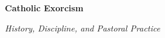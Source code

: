 \begin{titlepage}
\thispagestyle{empty}
\centering
\vspace*{0.045\textheight}
{\Huge\bfseries Catholic Exorcism\par}
\vspace{0.5em}
{\Large\itshape History, Discipline, and Pastoral Practice\par}
\vfill
\begin{minipage}{0.86\textwidth}
\small
\raggedright
\ExorcismEpigraphs{\endnote{\ExorcismClubContext}}
\end{minipage}
\vspace*{0.06\textheight}
\end{titlepage}

\ifdefined\TriptychPrintEdition
\else
\ExorcismEpigraphs{\endnote{\ExorcismClubContext}}
\fi
